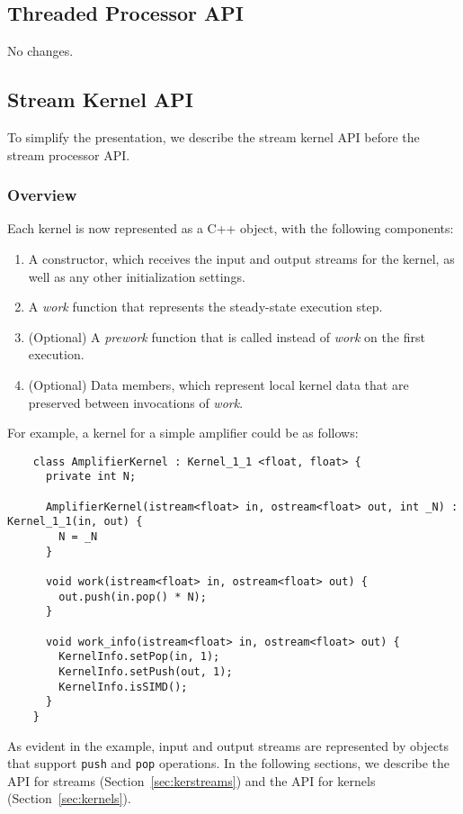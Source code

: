 \subsection{Threaded Processor API}

No changes.

\subsection{Stream Kernel API}

To simplify the presentation, we describe the stream kernel API before
the stream processor API.

\subsubsection{Overview}

Each kernel is now represented as a C++ object, with the following
components:

\begin{enumerate}

\item A constructor, which receives the input and output streams for
the kernel, as well as any other initialization settings.

\item A {\it work} function that represents the steady-state
execution step.

\item (Optional) A {\it prework} function that is called instead of
{\it work} on the first execution.

\item (Optional) Data members, which represent local kernel data that
are preserved between invocations of {\it work}.

\end{enumerate}

For example, a kernel for a simple amplifier could be as follows:
{\small
\begin{verbatim}
    class AmplifierKernel : Kernel_1_1 <float, float> {
      private int N;

      AmplifierKernel(istream<float> in, ostream<float> out, int _N) : Kernel_1_1(in, out) {
        N = _N
      }

      void work(istream<float> in, ostream<float> out) {
        out.push(in.pop() * N);
      }

      void work_info(istream<float> in, ostream<float> out) {
        KernelInfo.setPop(in, 1);
        KernelInfo.setPush(out, 1);
        KernelInfo.isSIMD();
      }
    }  
\end{verbatim}}
As evident in the example, input and output streams are represented by
objects that support {\tt push} and {\tt pop} operations.  In the
following sections, we describe the API for streams
(Section~\ref{sec:kerstreams}) and the API for kernels
(Section~\ref{sec:kernels}).

